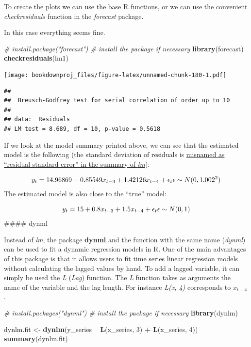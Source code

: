 \documentclass[
]{article}
\newenvironment{Shaded}{\begin{snugshade}}{\end{snugshade}}
\newcommand{\CommentTok}[1]{\textcolor[rgb]{0.56,0.35,0.01}{\textit{#1}}}
\newcommand{\DecValTok}[1]{\textcolor[rgb]{0.00,0.00,0.81}{#1}}
\newcommand{\KeywordTok}[1]{\textcolor[rgb]{0.13,0.29,0.53}{\textbf{#1}}}
\newcommand{\NormalTok}[1]{#1}
\newcommand{\OperatorTok}[1]{\textcolor[rgb]{0.81,0.36,0.00}{\textbf{#1}}}
\newcommand{\StringTok}[1]{\textcolor[rgb]{0.31,0.60,0.02}{#1}}
\begin{document}
To create the plots we can use the base R functions, or we can use the convenient \emph{checkresiduals} function in the \emph{forecast} package.

In this case everything seems fine.

\begin{Shaded}
\begin{Highlighting}[]
\CommentTok{# install.package("forecast") # install the package if necessary}
\KeywordTok{library}\NormalTok{(forecast)}
\KeywordTok{checkresiduals}\NormalTok{(lm1)}
\end{Highlighting}
\end{Shaded}

\texttt{[image: bookdownproj\_files/figure-latex/unnamed-chunk-180-1.pdf]}

\begin{verbatim}
## 
##  Breusch-Godfrey test for serial correlation of order up to 10
## 
## data:  Residuals
## LM test = 8.689, df = 10, p-value = 0.5618
\end{verbatim}

If we look at the model summary printed above, we can see that the estimated model is the following (the standard deviation of residuals is \href{https://stat.ethz.ch/R-manual/R-devel/library/stats/html/sigma.html}{misnamed as ``residual standard error'' in the summary of \emph{lm}}):

\[
\begin{equation} 
y_t = 14.96869 + 0.85549x_{t-3} + 1.42126x_{t-4} + \epsilon_t \\
\epsilon \sim N(0, 1.002^2)
\end{equation} 
\]
The estimated model is also close to the ``true'' model:

\[
y_t = 15 + 0.8x_{t-3} + 1.5x_{t-4} + \epsilon_t \\
\epsilon \sim N(0, 1)
\]
\#\#\#\# dynml

Instead of \emph{lm}, the package \textbf{dynml} and the function with the same name (\emph{dynml}) can be used to fit a dynamic regression models in R. One of the main advantages of this package is that it allows users to fit time series linear regression models without calculating the lagged values by hand. To add a lagged variable, it can simply be used the \emph{L} (\emph{Lag}) function. The \emph{L} function takes as arguments the name of the variable and the lag length. For instance \emph{L(x, 4)} corresponds to \(x_{t-4}\).

\begin{Shaded}
\begin{Highlighting}[]
\CommentTok{# install.packages("dynml") # install the package if necessary}
\KeywordTok{library}\NormalTok{(dynlm)}

\NormalTok{dynlm.fit <-}\StringTok{ }\KeywordTok{dynlm}\NormalTok{(y_series }\OperatorTok{~}\StringTok{ }\KeywordTok{L}\NormalTok{(x_series, }\DecValTok{3}\NormalTok{) }\OperatorTok{+}\StringTok{ }\KeywordTok{L}\NormalTok{(x_series, }\DecValTok{4}\NormalTok{))}
\KeywordTok{summary}\NormalTok{(dynlm.fit)}
\end{Highlighting}
\end{Shaded}
\end{document}

